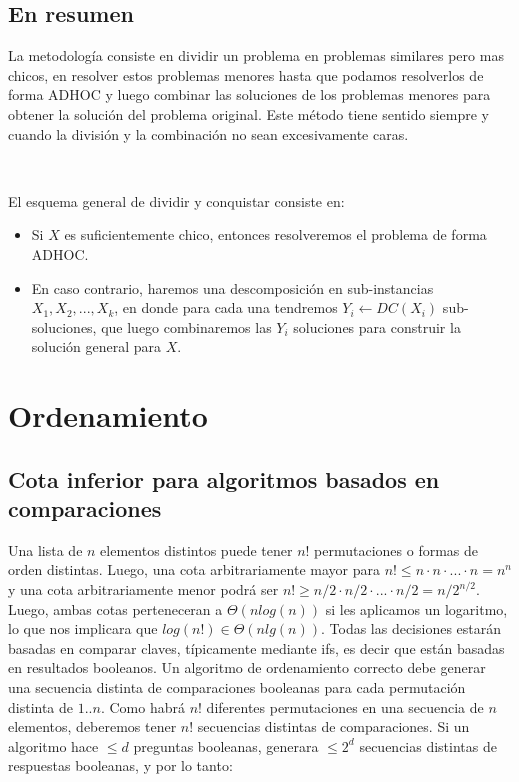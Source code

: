 \subsection{En resumen}

La metodolog\'ia consiste en dividir un problema en problemas similares pero mas chicos, en resolver estos problemas menores hasta que podamos resolverlos de forma ADHOC y luego combinar las soluciones de los problemas menores para obtener la soluci\'on del problema original. Este m\'etodo tiene sentido siempre y cuando la divisi\'on y la combinaci\'on no sean excesivamente caras.

~

El esquema general de dividir y conquistar consiste en:

\begin{itemize}
 \item Si $X$ es suficientemente chico, entonces resolveremos el problema de forma ADHOC.
 \item En caso contrario, haremos una descomposici\'on en sub-instancias $X_1, X_2, ..., X_k$, en donde para cada una tendremos $Y_i \gets DC(X_i)$ sub-soluciones, que luego combinaremos las $Y_i$ soluciones para construir la soluci\'on general para $X$.
\end{itemize}

\newpage

\section{Ordenamiento}

\subsection{Cota inferior para algoritmos basados en comparaciones}

Una lista de $n$ elementos distintos puede tener $n!$ permutaciones o formas de orden distintas. Luego, una cota arbitrariamente mayor para $n! \leq n \cdot n \cdot ... \cdot n = n^n$ y una cota arbitrariamente menor podr\'a ser $n! \geq n/2 \cdot n/2 \cdot ... \cdot n/2 = n/2^{n/2}$. Luego, ambas cotas perteneceran a $\Theta(n log(n))$ si les aplicamos un logaritmo, lo que nos implicara que $log(n!) \in \Theta(n lg(n))$.
Todas las decisiones estar\'an basadas en comparar claves, t\'ipicamente mediante ifs, es decir que est\'an basadas en resultados booleanos. Un algoritmo de ordenamiento correcto debe generar una secuencia distinta de comparaciones booleanas para cada permutaci\'on distinta de $1.. n$. Como habr\'a $n!$ diferentes permutaciones en una secuencia de $n$ elementos, deberemos tener $n!$ secuencias distintas de comparaciones. Si un algoritmo hace $\leq d$ preguntas booleanas, generara $\leq 2^d$ secuencias distintas de respuestas booleanas, y por lo tanto:

